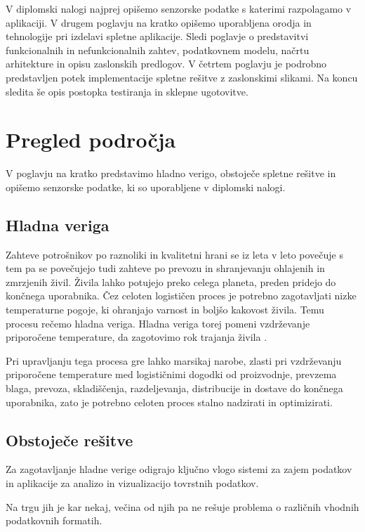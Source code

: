 \documentclass[a4paper, 12pt]{book}
\begin{document}
V diplomski nalogi najprej opišemo senzorske podatke s katerimi razpolagamo v aplikaciji. V drugem poglavju na kratko opišemo uporabljena orodja in tehnologije pri izdelavi spletne aplikacije. Sledi poglavje o predstavitvi funkcionalnih in nefunkcionalnih zahtev, podatkovnem modelu, načrtu arhitekture in opisu zaslonskih predlogov. V četrtem poglavju je podrobno predstavljen potek implementacije spletne rešitve z zaslonskimi slikami. Na koncu sledita še opis postopka testiranja in sklepne ugotovitve.



\chapter{Pregled področja}
\label{pregled-podrocja}

V poglavju na kratko predstavimo hladno verigo, obstoječe spletne rešitve in opišemo senzorske podatke, ki so uporabljene v diplomski nalogi.

\section{Hladna veriga}

Zahteve potrošnikov po raznoliki in kvalitetni hrani se iz leta v leto povečuje s tem pa se povečujejo tudi zahteve po prevozu in shranjevanju ohlajenih in zmrzjenih živil. Živila lahko potujejo preko celega planeta, preden pridejo do končnega uporabnika. Čez celoten logističen proces je potrebno zagotavljati nizke temperaturne pogoje, ki ohranjajo varnost in boljšo kakovost živila. Temu procesu rečemo hladna veriga.
Hladna veriga torej pomeni vzdrževanje priporočene temperature, da zagotovimo rok trajanja živila \cite{hladna-veriga}.

Pri upravljanju tega procesa gre lahko marsikaj narobe, zlasti pri vzdrževanju priporočene temperature med logističnimi dogodki od proizvodnje, prevzema blaga, prevoza, skladiščenja, razdeljevanja, distribucije in dostave do končnega uporabnika, zato je potrebno celoten proces stalno nadzirati in optimizirati.


\section{Obstoječe rešitve}

Za zagotavljanje hladne verige odigrajo ključno vlogo sistemi za zajem podatkov in aplikacije za analizo in vizualizacijo tovrstnih podatkov. 

Na trgu jih je kar nekaj, večina od njih pa ne rešuje problema o različnih vhodnih podatkovnih formatih.
\end{document}
